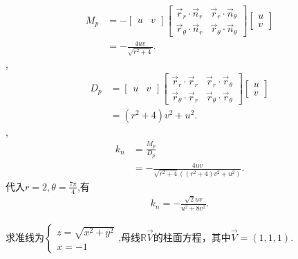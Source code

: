\begin{solution}
\begin{gather*}
    \end{gather*}
    \begin{align*}
        M_p &= -\begin{bmatrix}
            u &v 
        \end{bmatrix}\begin{bmatrix}
            \overrightarrow{r}_r \cdot \overrightarrow{n}_r &\overrightarrow{r}_r \cdot \overrightarrow{n}_\theta \\
            \overrightarrow{r}_\theta \cdot \overrightarrow{n}_r &\overrightarrow{r}_\theta \cdot \overrightarrow{n}_\theta        \end{bmatrix}\begin{bmatrix}
                u \\ v
            \end{bmatrix}\\
        &= -\frac{4 u v}{\sqrt{r^2+4}}.
    \end{align*},
    \begin{align*}
        D_p &= \begin{bmatrix}
            u &v 
        \end{bmatrix}\begin{bmatrix}
            \overrightarrow{r}_r \cdot \overrightarrow{r}_r &\overrightarrow{r}_r \cdot \overrightarrow{r}_\theta \\
            \overrightarrow{r}_\theta \cdot \overrightarrow{r}_r &\overrightarrow{r}_\theta \cdot \overrightarrow{r}_\theta        \end{bmatrix}\begin{bmatrix}
                u \\ v
            \end{bmatrix}\\
        &= \left(r^2+4\right) v^2+u^2.
    \end{align*},
    \begin{align*}
        k_n &=\frac{M_p}{D_p} \\
        &= -\frac{4 u v}{\sqrt{r^2+4} \left(\left(r^2+4\right) v^2+u^2\right)}.
    \end{align*}
    代入$r=2,\theta=\displaystyle \frac{7\pi}{4}$,有
    \begin{align*}
        k_n =-\frac{\sqrt{2} u v}{u^2+8 v^2}.
    \end{align*}
\end{solution}

\begin{problem}{}{}
    求准线为$\begin{cases}
        z=\sqrt{x^2+y^2} \\
        x=-1
    \end{cases}$,母线$\mathbb{R} \overrightarrow{V}$的柱面方程，其中$\overrightarrow{V}=(1,1,1)$.
\end{problem}

